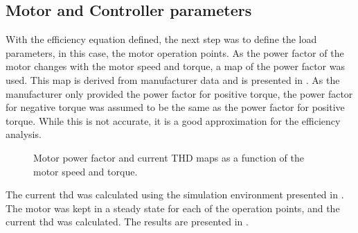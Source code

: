 \subsection{Motor and Controller parameters}
With the efficiency equation defined, the next step was to define the load parameters, in this case, the motor operation points. As the power factor of the motor changes with the motor speed and torque, a map of the power factor was used. This map is derived from manufacturer data and is presented in . As the manufacturer only provided the power factor for positive torque, the power factor for negative torque was assumed to be the same as the power factor for positive torque. While this is not accurate, it is a good approximation for the efficiency analysis.
\begin{figure}[H]
	\centering
	\begin{subfigmatrix}{2}
	\end{subfigmatrix}
	\caption{Motor power factor and current THD maps as a function of the motor speed and torque.}
	\label{fig:motor_power_factor_THD_map}
\end{figure}

The current \gls{thd} was calculated using the simulation environment presented in . The motor was kept in a steady state for each of the operation points, and the current \gls{thd} was calculated. The results are presented in .

